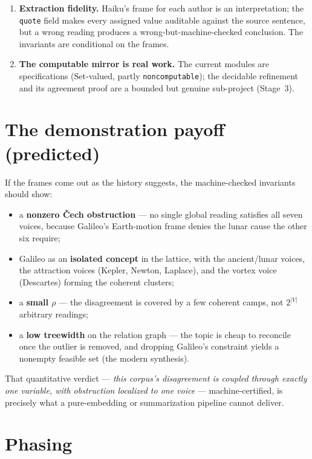 \documentclass[11pt]{article}
\newcommand{\lean}[1]{\texttt{#1}}
\begin{document}
\begin{enumerate}
\item \textbf{Extraction fidelity.} Haiku's frame for each author is an
  interpretation; the \lean{quote} field makes every assigned value
  auditable against the source sentence, but a wrong reading produces a
  wrong-but-machine-checked conclusion. The invariants are conditional on
  the frames.
\item \textbf{The computable mirror is real work.} The current modules are
  specifications ($\mathrm{Set}$-valued, partly \lean{noncomputable}); the
  decidable refinement and its agreement proof are a bounded but genuine
  sub-project (Stage~3).
\end{enumerate}

\section{The demonstration payoff (predicted)}

If the frames come out as the history suggests, the machine-checked
invariants should show:
\begin{itemize}
\item a \textbf{nonzero Čech obstruction} --- no single global reading
  satisfies all seven voices, because Galileo's Earth-motion frame denies
  the lunar cause the other six require;
\item Galileo as an \textbf{isolated concept} in the lattice, with the
  ancient/lunar voices, the attraction voices (Kepler, Newton, Laplace),
  and the vortex voice (Descartes) forming the coherent clusters;
\item a \textbf{small $\rho$} --- the disagreement is covered by a few
  coherent camps, not $2^{|V|}$ arbitrary readings;
\item a \textbf{low treewidth} on the relation graph --- the topic is
  cheap to reconcile once the outlier is removed, and dropping Galileo's
  constraint yields a nonempty feasible set (the modern synthesis).
\end{itemize}
That quantitative verdict --- \emph{this corpus's disagreement is coupled
through exactly one variable, with obstruction localized to one voice} ---
machine-certified, is precisely what a pure-embedding or summarization
pipeline cannot deliver.

\section{Phasing}
\end{document}
